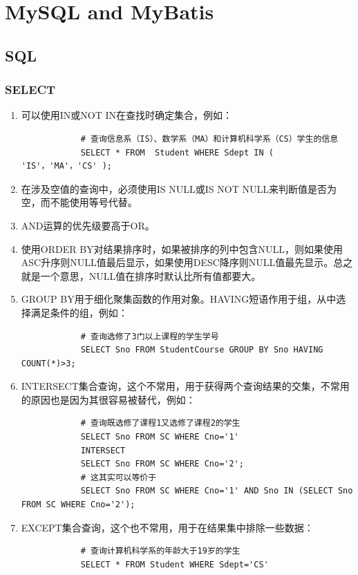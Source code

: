 \documentclass[main.tex]{subfiles}
\begin{document}
\chapter{MySQL and MyBatis}
\section{SQL}
\subsection{SELECT}
\begin{enumerate}
    \item 可以使用IN或NOT IN在查找时确定集合，例如：
        \begin{verbatim}
            # 查询信息系（IS）、数学系（MA）和计算机科学系（CS）学生的信息
            SELECT * FROM  Student WHERE Sdept IN ( 'IS'，'MA'，'CS' );
        \end{verbatim}
    \item 在涉及空值的查询中，必须使用IS NULL或IS NOT NULL来判断值是否为空，而不能使用等号代替。
    \item AND运算的优先级要高于OR。
    \item 使用ORDER BY对结果排序时，如果被排序的列中包含NULL，则如果使用ASC升序则NULL值最后显示，如果使用DESC降序则NULL值最先显示。总之就是一个意思，NULL值在排序时默认比所有值都要大。
    \item GROUP BY用于细化聚集函数的作用对象。HAVING短语作用于组，从中选择满足条件的组，例如：
        \begin{verbatim}
            # 查询选修了3门以上课程的学生学号
            SELECT Sno FROM StudentCourse GROUP BY Sno HAVING COUNT(*)>3;
        \end{verbatim}
    \item INTERSECT集合查询，这个不常用，用于获得两个查询结果的交集，不常用的原因也是因为其很容易被替代，例如：
        \begin{verbatim}
            # 查询既选修了课程1又选修了课程2的学生
            SELECT Sno FROM SC WHERE Cno='1'
            INTERSECT
            SELECT Sno FROM SC WHERE Cno='2';
            # 这其实可以等价于
            SELECT Sno FROM SC WHERE Cno='1' AND Sno IN (SELECT Sno FROM SC WHERE Cno='2');
        \end{verbatim}
    \item EXCEPT集合查询，这个也不常用，用于在结果集中排除一些数据：
        \begin{verbatim}
            # 查询计算机科学系的年龄大于19岁的学生
            SELECT * FROM Student WHERE Sdept='CS'

\end{verbatim}
\end{enumerate}
\end{document}
